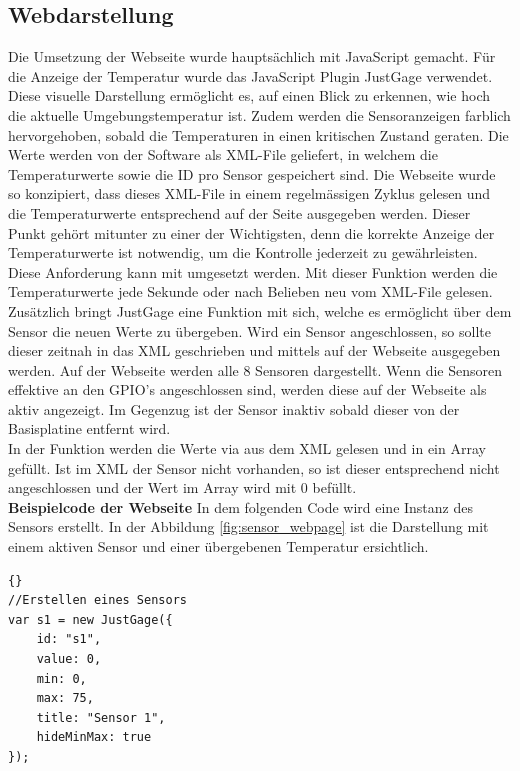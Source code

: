 \subsection{Webdarstellung}
Die Umsetzung der Webseite wurde hauptsächlich mit JavaScript gemacht.
Für die Anzeige der Temperatur wurde das JavaScript Plugin JustGage verwendet. Diese visuelle Darstellung ermöglicht es, auf einen Blick zu erkennen, wie hoch die aktuelle Umgebungstemperatur ist. Zudem werden die Sensoranzeigen farblich hervorgehoben, sobald die Temperaturen in einen kritischen Zustand geraten. 
Die Werte werden von der Software als XML-File geliefert, in welchem die Temperaturwerte sowie die ID pro Sensor gespeichert sind. Die Webseite wurde so konzipiert, dass dieses XML-File in einem regelmässigen Zyklus gelesen und die Temperaturwerte entsprechend auf der Seite ausgegeben werden. Dieser Punkt gehört mitunter zu einer der Wichtigsten, denn die korrekte Anzeige der Temperaturwerte ist notwendig, um die Kontrolle jederzeit zu gewährleisten. Diese Anforderung kann mit  umgesetzt werden. Mit dieser Funktion werden die Temperaturwerte jede Sekunde oder nach Belieben neu vom XML-File gelesen.
Zusätzlich bringt JustGage eine Funktion mit sich, welche es ermöglicht über  dem Sensor die neuen Werte zu übergeben. Wird ein Sensor angeschlossen, so sollte dieser zeitnah in das XML geschrieben und mittels  auf der Webseite ausgegeben werden. Auf der Webseite werden alle 8 Sensoren dargestellt. Wenn die Sensoren effektive an den GPIO's angeschlossen sind,  werden diese auf der Webseite als \grqq{}aktiv\glqq{} angezeigt. Im Gegenzug ist der Sensor \grqq{}inaktiv\glqq{} sobald dieser von der Basisplatine entfernt wird.\\
In der Funktion  werden die Werte via  aus dem XML gelesen und in ein Array gefüllt. Ist im XML der Sensor nicht vorhanden, so ist dieser entsprechend nicht angeschlossen und der Wert im Array wird mit 0 befüllt.\\

\textbf{Beispielcode der Webseite}\newline 
In dem folgenden Code wird eine Instanz des Sensors erstellt. In der Abbildung \ref{fig:sensor_webpage} ist die Darstellung mit einem aktiven Sensor und einer übergebenen Temperatur ersichtlich. 
\begin{lstlisting}{}
//Erstellen eines Sensors
var s1 = new JustGage({
	id: "s1",
	value: 0,
	min: 0,
	max: 75,
	title: "Sensor 1",
	hideMinMax: true
});
\end{lstlisting}

